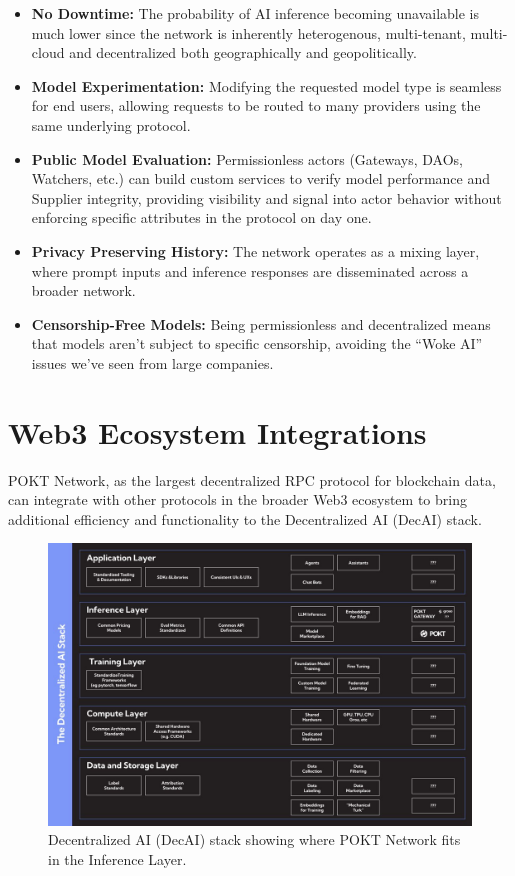 \documentclass[conference,compsoc]{IEEEtran}
\begin{document}
\begin{itemize}
    \item \textbf{No Downtime:} The probability of AI inference becoming unavailable is much lower since the network is inherently heterogenous, multi-tenant, multi-cloud and decentralized both geographically and geopolitically.

    \item \textbf{Model Experimentation: } Modifying the requested model type is seamless for end users, allowing requests to be routed to many providers using the same underlying protocol.

    \item \textbf{Public Model Evaluation:} Permissionless actors (Gateways, DAOs, Watchers, etc.) can build custom services to verify model performance and Supplier integrity, providing visibility and signal into actor behavior without enforcing specific attributes in the protocol on day one.

    \item \textbf{Privacy Preserving History:} The network operates as a mixing layer, where prompt inputs and inference responses are disseminated across a broader network.

    \item \textbf{Censorship-Free Models:}  Being permissionless and decentralized means that models aren’t subject to specific censorship, avoiding the “Woke AI”~\cite{thefpGooglesWoke} issues we’ve seen from large companies.
\end{itemize}

\section{Web3 Ecosystem Integrations}

POKT Network, as the largest decentralized RPC protocol for blockchain data, can integrate with other protocols in the broader Web3 ecosystem to bring additional efficiency and functionality to the Decentralized AI (DecAI) stack.


\begin{figure}[!h]
\centering
\includegraphics[width=0.9\linewidth]{stack.jpeg}
\caption{Decentralized AI (DecAI) stack showing where POKT Network fits in the Inference Layer.}
\label{fig_stack}
\end{figure}
\end{document}
